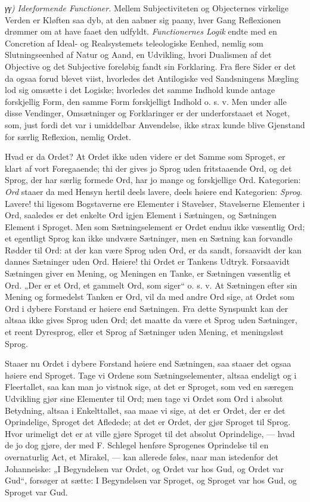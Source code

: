 \documentclass[12pt]{book}
\newcommand{\opage}[1]{\marginnote{\footnotesize\textit{[#1]}}}
\begin{document}
\textit{γγ)} \emph{Ideeformende Functioner.} Mellem Subjectiviteten
og Objecternes virkelige Verden er Kløften saa dyb,
at den aabner sig paany, hver Gang Reflexionen drømmer
om at have faaet den udfyldt. \emph{Functionernes Logik}
endte med en Concretion af Ideal- og Realsystemets teleologiske
Eenhed, nemlig som Slutningseenhed af Natur og
Aand, en Udvikling, hvori Dualismen af det Objective og det
Subjective foreløbig fandt sin Forklaring. Fra flere Sider
er det da ogsaa forud blevet viist, hvorledes det Antilogiske
ved Sandsningens Mægling lod sig omsætte i det Logiske;
hvorledes det samme Indhold kunde antage forskjellig Form,
den samme Form forskjelligt Indhold o. s. v. Men under
\opage{71}alle disse Vendinger, Omsætninger og Forklaringer er der
underforstaaet et Noget, som, just fordi det var i umiddelbar
Anvendelse, ikke strax kunde blive Gjenstand for særlig Reflexion,
nemlig Ordet.

Hvad er da Ordet? At Ordet ikke uden videre er det
Samme som Sproget, er klart af vort Foregaaende; thi der
gives jo Sprog uden fritstaaende Ord, og det Sprog, der har
særlig formede Ord, har jo mange og forskjellige Ord. Kategorien:
\emph{Ord} staaer da med Hensyn hertil deels lavere,
deels høiere end Kategorien: \emph{Sprog}. Lavere! thi ligesom Bogstaverne
ere Elementer i Stavelser, Stavelserne Elementer i
Ord, saaledes er det enkelte Ord igjen Element i Sætningen,
og Sætningen Element i Sproget. Men som Sætningselement
er Ordet endnu ikke væsentlig Ord; et egentligt Sprog
kan ikke undvære Sætninger, men en Sætning kan forvandle
Rødder til Ord: at der kan være Sprog uden Ord, er da
sandt, forsaavidt der kan dannes Sætninger uden Ord. Høiere!
thi Ordet er Tankens Udtryk. Forsaavidt Sætningen giver
en Mening, og Meningen en Tanke, er Sætningen væsentlig
et Ord. „Der er et Ord, et gammelt Ord, som siger“ o. s. v.
At Sætningen efter sin Mening og formedelst Tanken er Ord,
vil da med andre Ord sige, at Ordet som Ord i dybere Forstand
er høiere end Sætningen. Fra dette Synspunkt kan
der altsaa ikke gives Sprog uden Ord; det maatte da være
et Sprog uden Sætninger, et reent Dyresprog, eller et Sprog
af Sætninger uden Mening, et meningsløst Sprog.

Staaer nu Ordet i dybere Forstand høiere end Sætningen,
saa staaer det ogsaa høiere end Sproget. Tage vi
Ordene som Sætningselementer, altsaa endeligt og i Fleertallet,
saa kan man jo vistnok sige, at det er Sproget, som
ved en særegen Udvikling gjør sine Elementer til Ord; men
tage vi Ordet som Ord i absolut Betydning, altsaa i Enkelttallet,
saa maae vi sige, at det er Ordet, der er det Oprindelige,
Sproget det Afledede; at det er Ordet, der gjør
\opage{72}Sproget til Sprog. Hvor urimeligt det er at ville gjøre
Sproget til det absolut Oprindelige, --- hvad de jo dog gjøre,
der med F. Schlegel henføre Sprogenes Oprindelse til en
overnaturlig Act, et Mirakel, --- kan allerede føles, naar man
istedenfor det Johanneiske: „I Begyndelsen var Ordet, og
Ordet var hos Gud, og Ordet var Gud“, forsøger at sætte:
I Begyndelsen var Sproget, og Sproget var hos Gud, og
Sproget var Gud.
\end{document}
